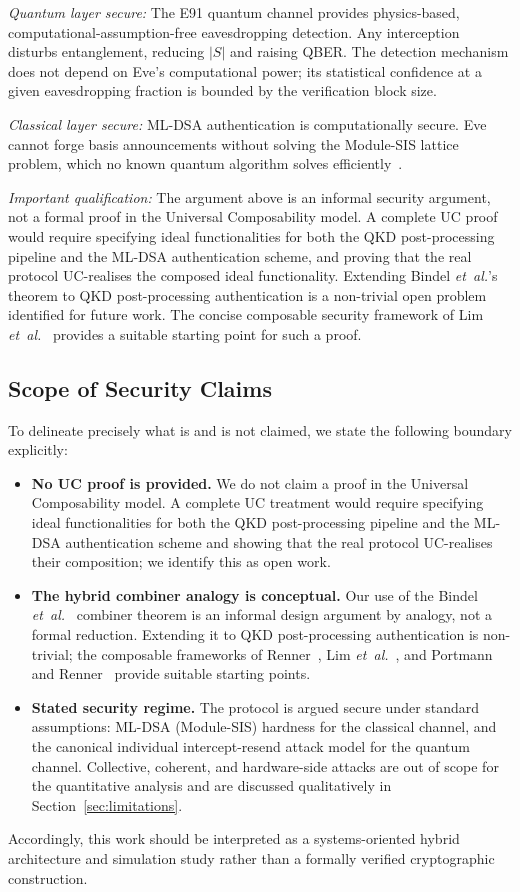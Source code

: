 \documentclass[conference]{IEEEtran}
\begin{document}
\emph{Quantum layer secure:} The E91 quantum channel provides physics-based, computational-assumption-free eavesdropping detection. Any interception disturbs entanglement, reducing $|S|$ and raising QBER. The detection mechanism does not depend on Eve's computational power; its statistical confidence at a given eavesdropping fraction is bounded by the verification block size.

\emph{Classical layer secure:} ML-DSA authentication is computationally secure. Eve cannot forge basis announcements without solving the Module-SIS lattice problem, which no known quantum algorithm solves efficiently~\cite{fips204}.

\emph{Important qualification:} The argument above is an informal security argument, not a formal proof in the Universal Composability model. A complete UC proof would require specifying ideal functionalities for both the QKD post-processing pipeline and the ML-DSA authentication scheme, and proving that the real protocol UC-realises the composed ideal functionality. Extending Bindel \emph{et~al.}'s theorem to QKD post-processing authentication is a non-trivial open problem identified for future work. The concise composable security framework of Lim \emph{et~al.}~\cite{lim2014} provides a suitable starting point for such a proof.

\subsection{Scope of Security Claims}
\label{sec:scope}
To delineate precisely what is and is not claimed, we state the following boundary explicitly:
\begin{itemize}
\item \textbf{No UC proof is provided.} We do not claim a proof in the Universal Composability model. A complete UC treatment would require specifying ideal functionalities for both the QKD post-processing pipeline and the ML-DSA authentication scheme and showing that the real protocol UC-realises their composition; we identify this as open work.
\item \textbf{The hybrid combiner analogy is conceptual.} Our use of the Bindel \emph{et~al.}~\cite{bindel2019} combiner theorem is an informal design argument by analogy, not a formal reduction. Extending it to QKD post-processing authentication is non-trivial; the composable frameworks of Renner~\cite{renner2008}, Lim \emph{et~al.}~\cite{lim2014}, and Portmann and Renner~\cite{portmann2022} provide suitable starting points.
\item \textbf{Stated security regime.} The protocol is argued secure under standard assumptions: ML-DSA (Module-SIS) hardness for the classical channel, and the canonical individual intercept-resend attack model for the quantum channel. Collective, coherent, and hardware-side attacks are out of scope for the quantitative analysis and are discussed qualitatively in Section~\ref{sec:limitations}.
\end{itemize}
Accordingly, this work should be interpreted as a systems-oriented hybrid architecture and simulation study rather than a formally verified cryptographic construction.
\end{document}
